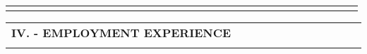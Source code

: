 \documentclass[11pt, letterpaper]{extarticle}
\begin{document}
\begin{longtable}{C{0.154\linewidth}C{0.834\linewidth}N}
		                                                             &                                                                                                                                                                                                                                                  & \\[-0.25cm] \hline
		                                                             &                                                                                                                                                                                                                                                  & \\[-0.25cm]
	\end{longtable}

	\newpage


	\label{tab:IV}
	\begin{longtable}{C{1.000\linewidth}C{0.000\linewidth}N} 
		\textbf{\Large IV. - EMPLOYMENT EXPERIENCE} & \\[0.80cm] 
	\end{longtable}
\end{document}
